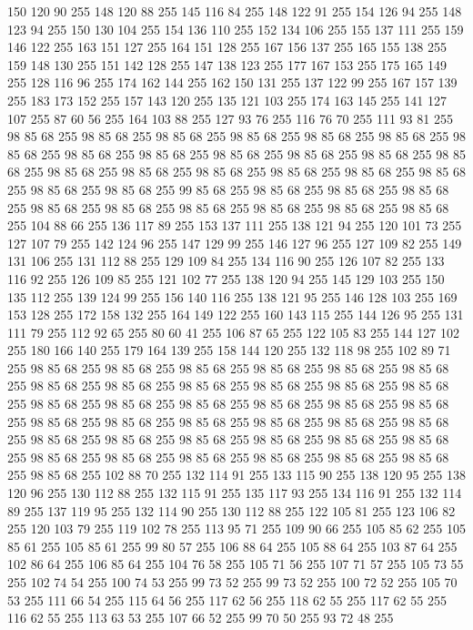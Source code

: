 150 120 90 255 148 120 88 255 145 116 84 255 148 122 91 255 154 126 94 255 148 123 94 255 150 130 104 255 154 136 110 255 152 134 106 255 155 137 111 255 159 146 122 255 163 151 127 255 164 151 128 255 167 156 137 255 165 155 138 255 159 148 130 255 151 142 128 255 147 138 123 255 177 167 153 255 175 165 149 255 128 116 96 255 174 162 144 255 162 150 131 255 137 122 99 255 167 157 139 255 183 173 152 255 157 143 120 255 135 121 103 255 174 163 145 255 141 127 107 255 87 60 56 255 164 103 88 255 127 93 76 255 116 76 70 255 111 93 81 255 98 85 68 255 98 85 68 255 98 85 68 255 98 85 68 255 98 85 68 255 98 85 68 255 98 85 68 255 98 85 68 255 98 85 68 255 98 85 68 255 98 85 68 255 98 85 68 255 98 85 68 255 98 85 68 255 98 85 68 255 98 85 68 255 98 85 68 255 98 85 68 255 98 85 68 255 98 85 68 255 98 85 68 255 99 85 68 255 98 85 68 255 98 85 68 255 98 85 68 255 98 85 68 255 98 85 68 255 98 85 68 255 98 85 68 255
98 85 68 255 98 85 68 255 104 88 66 255 136 117 89 255 153 137 111 255 138 121 94 255 120 101 73 255 127 107 79 255 142 124 96 255 147 129 99 255 146 127 96 255 127 109 82 255 149 131 106 255 131 112 88 255 129 109 84 255 134 116 90 255 126 107 82 255 133 116 92 255 126 109 85 255 121 102 77 255 138 120 94 255 145 129 103 255 150 135 112 255 139 124 99 255 156 140 116 255 138 121 95 255 146 128 103 255 169 153 128 255 172 158 132 255 164 149 122 255 160 143 115 255 144 126 95 255 131 111 79 255 112 92 65 255 80 60 41 255 106 87 65 255 122 105 83 255 144 127 102 255 180 166 140 255 179 164 139 255 158 144 120 255 132 118 98 255 102 89 71 255 98 85 68 255 98 85 68 255 98 85 68 255 98 85 68 255 98 85 68 255 98 85 68 255 98 85 68 255 98 85 68 255 98 85 68 255 98 85 68 255 98 85 68 255 98 85 68 255 98 85 68 255 98 85 68 255 98 85 68 255 98 85 68 255 98 85 68 255 98 85 68 255 98 85 68 255 98 85 68 255 98 85 68 255
98 85 68 255 98 85 68 255 98 85 68 255 98 85 68 255 98 85 68 255 98 85 68 255 98 85 68 255 98 85 68 255 98 85 68 255 98 85 68 255 98 85 68 255 98 85 68 255 98 85 68 255 98 85 68 255 98 85 68 255 98 85 68 255 102 88 70 255 132 114 91 255 133 115 90 255 138 120 95 255 138 120 96 255 130 112 88 255 132 115 91 255 135 117 93 255 134 116 91 255 132 114 89 255 137 119 95 255 132 114 90 255 130 112 88 255 122 105 81 255 123 106 82 255 120 103 79 255 119 102 78 255 113 95 71 255 109 90 66 255 105 85 62 255 105 85 61 255 105 85 61 255 99 80 57 255 106 88 64 255 105 88 64 255 103 87 64 255 102 86 64 255 106 85 64 255 104 76 58 255 105 71 56 255 107 71 57 255 105 73 55 255 102 74 54 255 100 74 53 255 99 73 52 255 99 73 52 255 100 72 52 255 105 70 53 255 111 66 54 255 115 64 56 255 117 62 56 255 118 62 55 255 117 62 55 255 116 62 55 255 113 63 53 255 107 66 52 255 99 70 50 255 93 72 48 255
